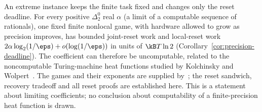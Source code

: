 An extreme instance keeps the finite task fixed and changes only the reset deadline. For every positive $\Delta^0_2$ real $\alpha$ (a limit of a computable sequence of rationals), one fixed finite nonlocal game, with hardware allowed to grow as precision improves, has bounded joint-reset work and local-reset work $2\alpha\log_2(1/\eps)+o(\log(1/\eps))$ in units of $\kB T\ln2$ (Corollary~\ref{cor:precision-deadline}). The coefficient can therefore be uncomputable, related to the noncomputable Turing-machine heat functions studied by Kolchinsky and Wolpert~\cite{HPKW20}. The games and their exponents are supplied by~\cite[Theorem~1.1]{HPuncomputable}; the reset sandwich, recovery tradeoff and all reset proofs are established here. This is a statement about limiting coefficients; no conclusion about computability of a finite-precision heat function is drawn.

